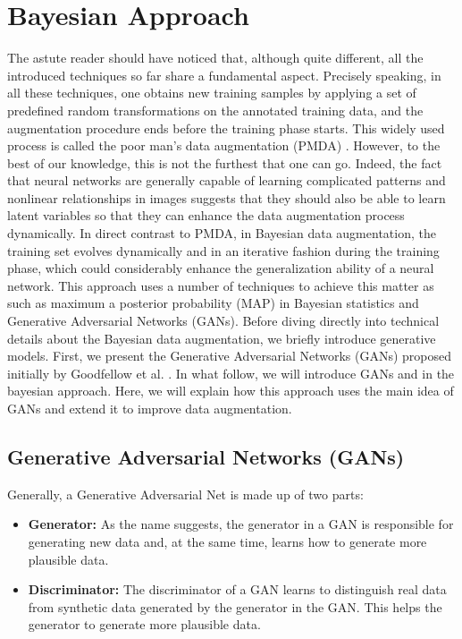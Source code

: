 \section{Bayesian Approach}
\label{tit:bayesian-approach}
The astute reader should have noticed that, although quite different, all the introduced techniques so far share a fundamental aspect. Precisely speaking, in all these techniques, one obtains new training samples by applying a set of predefined random transformations on the annotated training data, and the augmentation procedure ends before the training phase starts. This widely used process is called the poor man's data augmentation (PMDA) \cite{poor_man_data_augmentation}. However, to the best of our knowledge, this is not the furthest that one can go. Indeed, the fact that neural networks are generally capable of learning complicated patterns and nonlinear relationships in images suggests that they should also be able to learn latent variables so that they can enhance the data augmentation process dynamically.
In direct contrast to PMDA, in Bayesian data augmentation, the training set evolves dynamically and
in an iterative fashion during the training phase, which could considerably enhance the
generalization ability of a neural network. This approach uses a number of techniques to achieve this
matter as such as maximum a posterior probability (MAP) \cite{MAP_Bayesian} in Bayesian statistics and Generative
Adversarial Networks (GANs). Before diving directly into technical details about the
Bayesian data augmentation, we briefly introduce generative models. First, we
present the Generative Adversarial Networks (GANs) proposed initially by Goodfellow et al.
\cite{goodflew_bayesian_approach}. In what follow, we
will introduce GANs and in the bayesian approach. Here, we will explain how this
approach uses the main idea of GANs and extend it to improve data augmentation.

\subsection{Generative Adversarial Networks (GANs)}
\label{tit:Generative-Adversarial-Network}
Generally, a Generative Adversarial Net is made up of two parts:
\begin{itemize}
  \item{\textbf{Generator:}} As the name suggests, the generator in a GAN is responsible for generating new data and, at the same time, learns how to generate more plausible data.
  \item{\textbf{Discriminator:}} The discriminator of a GAN learns to distinguish real data from synthetic data generated
        by the generator in the GAN. This helps the generator to generate more plausible data.
\end{itemize}

